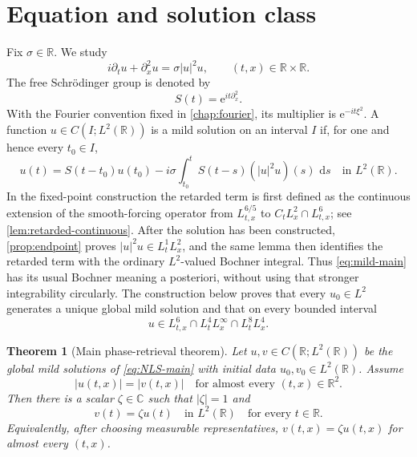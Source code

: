 \documentclass[11pt,oneside]{book}
\newtheorem{theorem}{Theorem}[chapter]
\theoremstyle{definition}
\theoremstyle{remark}
\newcommand{\R}{\mathbb R}
\newcommand{\C}{\mathbb C}
\newcommand{\1}{\mathbf 1}
\newcommand{\dd}{\,\mathrm d}
\newcommand{\e}{\mathrm e}
\begin{document}
\section{Equation and solution class}
Fix $\sigma\in\R$.  We study
\begin{equation}
  i\partial_tu+\partial_x^2u=\sigma |u|^2u,
  \qquad (t,x)\in\R\times\R.
  \label{eq:NLS-main}
\end{equation}
The free Schr\"odinger group is denoted by
\[
  S(t)=\e^{it\partial_x^2}.
\]
With the Fourier convention fixed in \cref{chap:fourier}, its multiplier is
$\e^{-it\xi^2}$.  A function $u\in C(I;L^2(\R))$ is a mild solution on an
interval $I$ if, for one and hence every $t_0\in I$,
\begin{equation}
 u(t)=S(t-t_0)u(t_0)
 -i\sigma\int_{t_0}^{t}S(t-s)(|u|^2u)(s)\,\dd s
 \quad\text{in }L^2(\R).                         \label{eq:mild-main}
\end{equation}
In the fixed-point construction the retarded term is first defined as the
continuous extension of the smooth-forcing operator from
$L^{6/5}_{t,x}$ to $C_tL^2_x\cap L^6_{t,x}$; see
\cref{lem:retarded-continuous}.  After the solution has been constructed,
\cref{prop:endpoint} proves $|u|^2u\in L^1_tL^2_x$, and the same lemma then
identifies the retarded term with the ordinary $L^2$-valued Bochner integral.
Thus \eqref{eq:mild-main} has its usual Bochner meaning a posteriori, without
using that stronger integrability circularly.  The construction below proves
that every $u_0\in L^2$ generates a unique global mild solution and that on
every bounded interval
\begin{equation}
 u\in L^6_{t,x}\cap L^4_tL^\infty_x\cap L^8_tL^4_x. \label{eq:solution-class-preview}
\end{equation}

\begin{theorem}[Main phase-retrieval theorem]\label{thm:main}
Let $u,v\in C(\R;L^2(\R))$ be the global mild solutions of
\eqref{eq:NLS-main} with initial data $u_0,v_0\in L^2(\R)$.  Assume
\begin{equation}
  |u(t,x)|=|v(t,x)|
  \quad\text{for almost every }(t,x)\in\R^2.       \label{eq:equal-modulus-main}
\end{equation}
Then there is a scalar $\zeta\in\C$ such that $|\zeta|=1$ and
\[
  v(t)=\zeta u(t)\quad\text{in }L^2(\R)
  \quad\text{for every }t\in\R.
\]
Equivalently, after choosing measurable representatives,
$v(t,x)=\zeta u(t,x)$ for almost every $(t,x)$.
\end{theorem}
\end{document}
